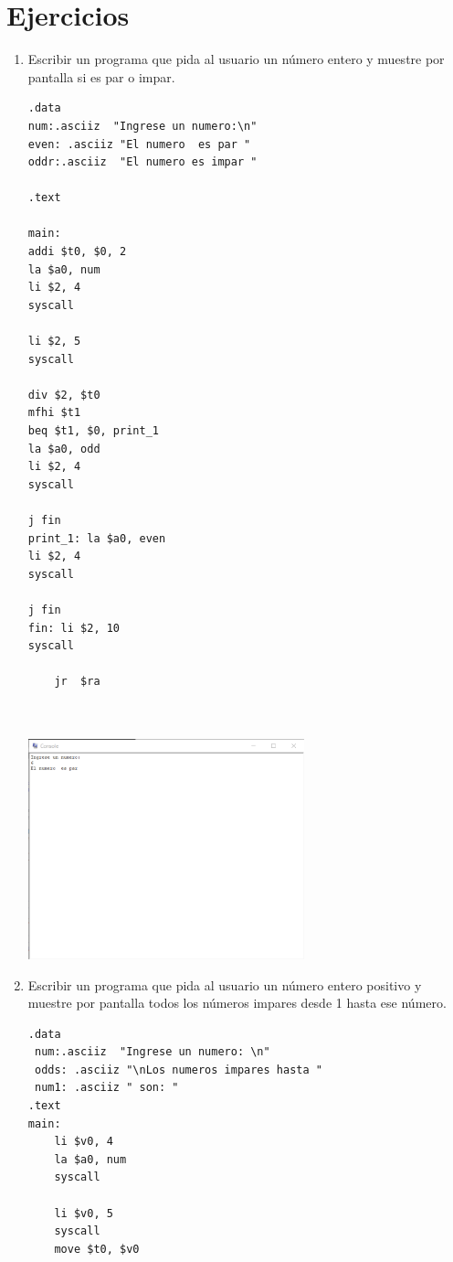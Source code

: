 \documentclass{article}
\begin{document}
	\section{Ejercicios}\label{sec:ejercicios}
	\begin{enumerate}
		\item Escribir un programa que pida al usuario un número entero y muestre por pantalla si es par o impar.
	

	
		\begin{lstlisting}[language={[x86masm]Assembler}, basicstyle=\small]
.data 
num:.asciiz  "Ingrese un numero:\n"
even: .asciiz "El numero  es par "
oddr:.asciiz  "El numero es impar "

.text  

main:
addi $t0, $0, 2 
la $a0, num  
li $2, 4
syscall

li $2, 5
syscall

div $2, $t0 
mfhi $t1
beq $t1, $0, print_1  
la $a0, odd  
li $2, 4
syscall

j fin
print_1: la $a0, even
li $2, 4
syscall

j fin
fin: li $2, 10
syscall

	jr	$ra

	
		   \end{lstlisting}
	\includegraphics[width=8cm]{img/eje1.png}
	\newpage
	\item Escribir un programa que pida al usuario un número entero positivo y muestre por pantalla todos los números impares desde 1 hasta ese número.
	
		\begin{lstlisting}[language={[x86masm]Assembler}, basicstyle=\small]
.data 	
 num:.asciiz  "Ingrese un numero: \n"
 odds: .asciiz "\nLos numeros impares hasta "
 num1: .asciiz " son: "
.text 
main:
	li $v0, 4
	la $a0, num 
	syscall 

	li $v0, 5
	syscall
	move $t0, $v0
	

\end{lstlisting}
\end{enumerate}
\end{document}
